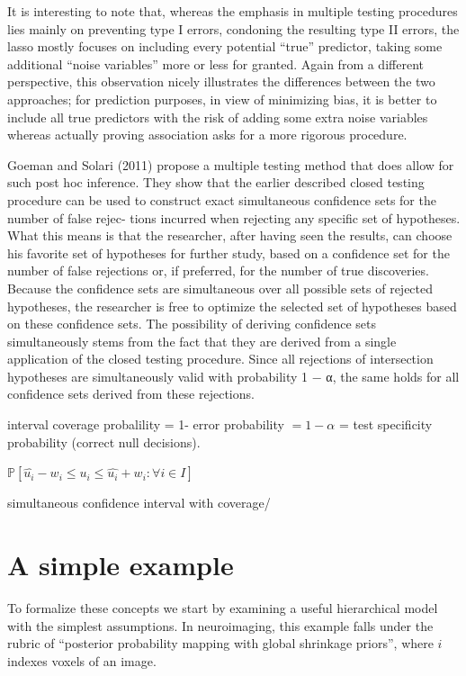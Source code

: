 \documentclass{article}
\begin{document}
It is interesting to note that, whereas the emphasis in multiple testing procedures lies mainly on preventing type I errors, condoning the resulting type II errors, the lasso mostly focuses on including every potential “true” predictor, taking some additional ``noise variables'' more or less for granted. Again from a different perspective, this observation nicely illustrates the differences between the two approaches; for prediction purposes, in view of minimizing bias, it is better to include all true predictors with the risk of adding some extra noise variables whereas actually proving association asks for a more rigorous procedure.

Goeman and Solari (2011) propose a multiple testing method that does allow for such post hoc inference. They show that the earlier described closed testing procedure can be used to construct exact simultaneous confidence sets for the number of false rejec- tions incurred when rejecting any specific set of hypotheses. What this means is that the researcher, after having seen the results, can choose his favorite set of hypotheses for further study, based on a confidence set for the number of false rejections or, if preferred, for the number of true discoveries. Because the confidence sets are simultaneous over all possible sets of rejected hypotheses, the researcher is free to optimize the selected set of hypotheses based on these confidence sets.
The possibility of deriving confidence sets simultaneously stems from the fact that they are derived from a single application of the closed testing procedure. Since all rejections of intersection hypotheses are simultaneously valid with probability 1 − α, the same holds for all confidence sets derived from these rejections.

interval coverage probalility = 1- error probability $= 1 - \alpha$ = test specificity probability (correct null decisions).

$\mathbb{P}[ \hat{u_i} - w_i \leq u_i \leq \hat{u_i} + w_i: \forall i \in I]$


simultaneous confidence interval with coverage/

 
\section{A simple example} 
To formalize these concepts we start by examining a useful hierarchical model with the simplest assumptions. In neuroimaging, this example falls under the rubric of ``posterior probability mapping with global shrinkage priors'', where $i$ indexes voxels of an image.
\end{document}
